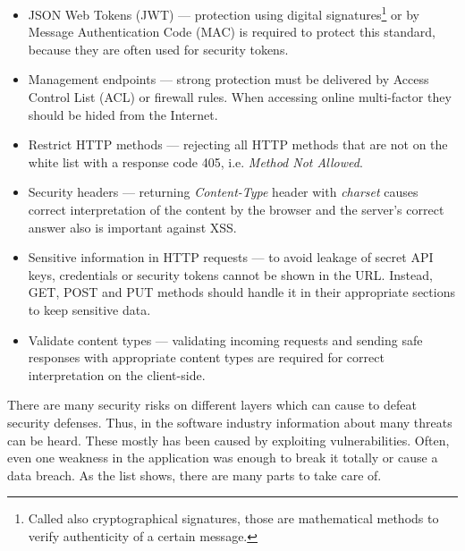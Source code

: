 \documentclass{article} %
\begin{document}
\begin{itemize}
    \item JSON Web Tokens (JWT) --- protection using digital signatures\footnote{Called also cryptographical signatures, those are mathematical methods to verify authenticity of a certain message.} or by Message Authentication Code (MAC) is required to protect this standard, because they are often used for security tokens.
    \item Management endpoints --- strong protection must be delivered by Access Control List (ACL) or firewall rules. When accessing online multi-factor they should be hided from the Internet.
    \item Restrict HTTP methods --- rejecting all HTTP methods that are not on the white list with a response code 405, i.e. \textit{Method Not Allowed}.
    \item Security headers --- returning \textit{Content-Type} header with \textit{charset} causes correct interpretation of the content by the browser and the server's correct answer also is important against XSS.
    \item Sensitive information in HTTP requests --- to avoid leakage of secret API keys, credentials or security tokens cannot be shown in the URL. Instead, GET, POST and PUT methods should handle it in their appropriate sections to keep sensitive data.
    \item Validate content types --- validating incoming requests and sending safe responses with appropriate content types are required for correct interpretation on the client-side.
\end{itemize}
There are many security risks on different layers which can cause to defeat security defenses. Thus, in the software industry information about many threats can be heard. These mostly has been caused by exploiting vulnerabilities. Often, even one weakness in the application was enough to break it totally or cause a data breach. As the list shows, there are many parts to take care of.
\end{document}
